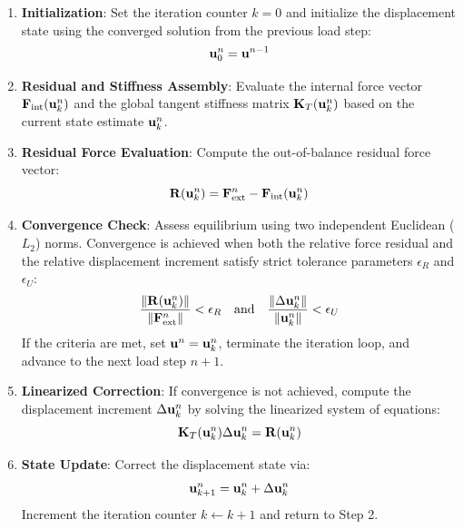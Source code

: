 \begin{enumerate}
        \item \textbf{Initialization}: Set the iteration counter $k = 0$ and initialize the displacement state using the converged solution from the previous load step:
        \begin{equation}
                \mathbf{u}_0^n = \mathbf{u}^{n-1}
        \end{equation}
        \item \textbf{Residual and Stiffness Assembly}: Evaluate the internal force vector $\mathbf{F}_{\text{int}}(\mathbf{u}_k^n)$ and the global tangent stiffness matrix $\mathbf{K}_T(\mathbf{u}_k^n)$ based on the current state estimate $\mathbf{u}_k^n$.
        \item \textbf{Residual Force Evaluation}: Compute the out-of-balance residual force vector:
        \begin{equation}
                \mathbf{R}(\mathbf{u}_k^n) = \mathbf{F}_{\text{ext}}^n - \mathbf{F}_{\text{int}}(\mathbf{u}_k^n)
        \end{equation}
        \item \textbf{Convergence Check}: Assess equilibrium using two independent Euclidean ($L_2$) norms. Convergence is achieved when both the relative force residual and the relative displacement increment satisfy strict tolerance parameters $\epsilon_R$ and $\epsilon_U$:
        \begin{equation}
                \frac{\|\mathbf{R}(\mathbf{u}_k^n)\|}{\|\mathbf{F}_{\text{ext}}^n\|} < \epsilon_R \quad \text{and} \quad \frac{\|\Delta \mathbf{u}_k^n\|}{\|\mathbf{u}_k^n\|} < \epsilon_U
        \end{equation}
        If the criteria are met, set $\mathbf{u}^n = \mathbf{u}_k^n$, terminate the iteration loop, and advance to the next load step $n+1$.
        \item \textbf{Linearized Correction}: If convergence is not achieved, compute the displacement increment $\Delta \mathbf{u}_k^n$ by solving the linearized system of equations:
        \begin{equation}
                \mathbf{K}_T(\mathbf{u}_k^n) \Delta \mathbf{u}_k^n = \mathbf{R}(\mathbf{u}_k^n)
        \end{equation}
        \item \textbf{State Update}: Correct the displacement state via:
        \begin{equation}
                \mathbf{u}_{k+1}^n = \mathbf{u}_k^n + \Delta \mathbf{u}_k^n
        \end{equation}
        Increment the iteration counter $k \leftarrow k+1$ and return to Step 2.
\end{enumerate}

